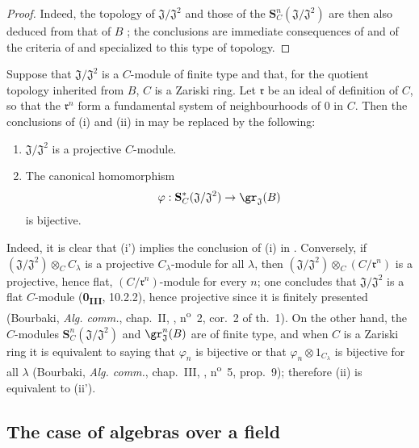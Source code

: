 \begin{proof}
Indeed, the topology of $\mathfrak{J}/\mathfrak{J}^2$ and those of the $\mathbf{S}_C^n(\mathfrak{J}/\mathfrak{J}^2)$ are then also deduced from that of $B$ ;
the conclusions are immediate consequences of  and of the criteria of  and  specialized to this type of topology.
\end{proof}

\begin{remark}[19.5.8]
\label{0.19.5.8}
Suppose that $\mathfrak{J}/\mathfrak{J}^2$ is a $C$-module of finite type and that, for the quotient topology inherited from $B$, $C$ is a Zariski ring.
Let $\mathfrak{r}$ be an ideal of definition of $C$, so that the $\mathfrak{r}^n$ form a fundamental system of neighbourhoods of $0$ in $C$.
Then the conclusions of {\rm(i)} and {\rm(ii)} in  may be replaced by the following:
\begin{enumerate}
  \item[\rm(i')] $\mathfrak{J}/\mathfrak{J}^2$ is a projective $C$-module.
  \item[\rm(ii')] The canonical homomorphism
  \[
    \varphi:\mathbf{S}_C^*(\mathfrak{J}/\mathfrak{J}^2)\to\gr_\mathfrak{J}(B)
  \]
  is bijective.
\end{enumerate}
Indeed, it is clear that {\rm(i')} implies the conclusion of {\rm(i)} in .
Conversely, if $(\mathfrak{J}/\mathfrak{J}^2)\otimes_C C_\lambda$ is a projective $C_\lambda$-module for all $\lambda$, then $(\mathfrak{J}/\mathfrak{J}^2)\otimes_C(C/\mathfrak{r}^n)$ is a projective, hence flat, $(C/\mathfrak{r}^n)$-module for every $n$;
one concludes that $\mathfrak{J}/\mathfrak{J}^2$ is a flat $C$-module (\textbf{0\textsubscript{III}}, 10.2.2), hence projective since it is finitely presented (Bourbaki, \emph{Alg. comm.}, chap.~II, , n\textsuperscript{o}~2, cor.~2 of th.~1).
On the other hand, the $C$-modules $\mathbf{S}_C^n(\mathfrak{J}/\mathfrak{J}^2)$ and $\gr_\mathfrak{J}^n(B)$ are of finite type, and when $C$ is a Zariski ring it is equivalent to saying that $\varphi_n$ is bijective or that $\varphi_n\otimes 1_{C_\lambda}$ is bijective for all $\lambda$ (Bourbaki, \emph{Alg. comm.}, chap.~III, , n\textsuperscript{o}~5, prop.~9);
therefore {\rm(ii)} is equivalent to {\rm(ii')}.
\end{remark}

\subsection{The case of algebras over a field}
\label{subsection:0.19.6}

